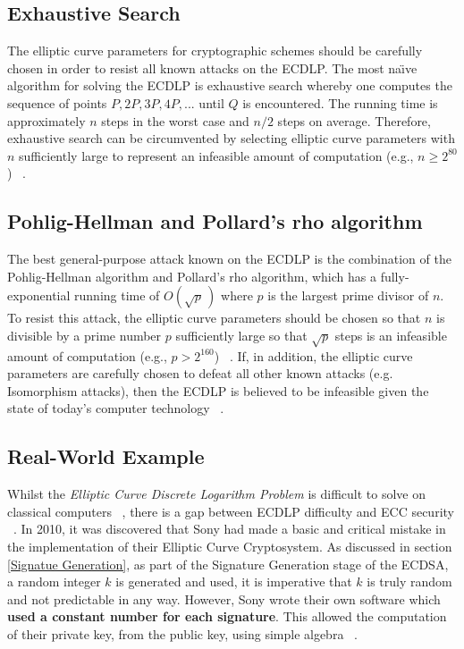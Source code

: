 \documentclass[11pt]{article}
\begin{document}
\subsection{Exhaustive Search} \label{Exhaustive Search}
The elliptic curve parameters for cryptographic schemes should be carefully chosen in order to resist all known attacks on the ECDLP. 
The most na\"{\i}ve algorithm for solving the ECDLP is exhaustive search whereby one computes the sequence of points $P,2P,3P,4P,...$ until $Q$ is encountered. 
The running time is approximately $n$ steps in the worst case and $n/2$ steps on average. 
Therefore, exhaustive search can be circumvented by selecting elliptic curve parameters with $n$ sufficiently large to represent an infeasible amount of computation (e.g., $n \geq 2^{80}$) ~\cite{hankerson2003guide}.

\subsection{Pohlig-Hellman and Pollard's rho algorithm} \label{Pohlig-Hellman and Pollard's rho algorithm}
The best general-purpose attack known on the ECDLP is the combination of the Pohlig-Hellman algorithm and Pollard's rho algorithm, 
which has a fully-exponential running time of $O( \sqrt p \,)$ where $p$ is the largest prime divisor of $n$. 
To resist this attack, the elliptic curve parameters should be chosen so that $n$ is divisible by a prime number $p$ sufficiently large 
so that $\sqrt p$ steps is an infeasible amount of computation (e.g., $p > 2^{160}$) ~\cite{hankerson2003guide}.
If, in addition, the elliptic curve parameters are carefully chosen to defeat all other known attacks (e.g. Isomorphism attacks), 
then the ECDLP is believed to be infeasible given the state of today's computer technology ~\cite{hankerson2003guide}.

\subsection{Real-World Example} \label{Real-World Example}
Whilst the \emph{Elliptic Curve Discrete Logarithm Problem} is difficult to solve on classical computers ~\cite{hankerson2003guide}, 
there is a gap between ECDLP difficulty and ECC security ~\cite{bernstein2013safecurves}. 
In 2010, it was discovered that Sony had made a basic and critical mistake in the implementation of their Elliptic Curve Cryptosystem. 
As discussed in section \ref{Signatue Generation}, as part of the Signature Generation stage of the ECDSA, a random integer $k$ is generated and used, 
it is imperative that $k$ is truly random and not predictable in any way. 
However, Sony wrote their own software which \textbf{used a constant number for each signature}. 
This allowed the computation of their private key, from the public key, using simple algebra ~\cite{hotz2010console}.
\end{document}
